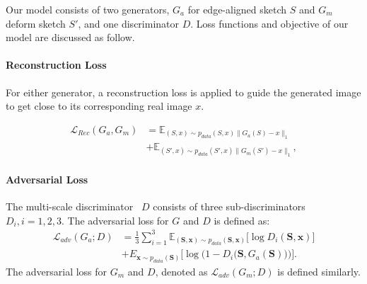 
Our model consists of two generators, $G_a$ for edge-aligned sketch $S$ and $G_m$ deform sketch $S'$, and one discriminator $D$. Loss functions and objective of our model are discussed as follow.

\paragraph{Reconstruction Loss}
For either generator, a reconstruction loss is applied to guide the generated image to get close to its corresponding real image $x$.

\begin{equation}
\label{eqn:loss_rec}
\begin{aligned}
\mathcal{L}_{Rec}(G_a, G_m) &=\mathbb{E}_{(S, x)\sim p_{data}(S,x)\|G_a(S) - x\|_1} \\
&+ \mathbb{E}_{(S', x)\sim p_{data}(S',x)\|G_m(S') - x\|_1},
\end{aligned}
\end{equation}

\paragraph{Adversarial Loss}
The multi-scale discriminator~\cite{pix2pixHD} $D$ consists of three sub-discriminators $D_i, i=1,2,3$.  The adversarial loss for $G$ and $D$ is defined as:
\begin{equation}
\label{eqn:new_loss_adv}
\begin{aligned}
\mathcal{L}_{adv}(G_a;D) &=\frac{1}{3}\sum_{i=1}^{3}\mathbb{E}_{(\bm{S},\bm{x})\sim p_{data}(\bm{S},\bm{x})}\big[\log D_i(\bm{S},\bm{x})\big] \\
& + E_{\bm{x}\sim p_{data}(\bm{S})}\Big[\log \Big(1-D_i \big(\bm{S},G_a(\bm{S})\big)\Big)\Big].
\end{aligned}
\end{equation}
The adversarial loss for $G_m$ and $D$, denoted as $\mathcal{L}_{adv}(G_m;D)$ is defined similarly.

